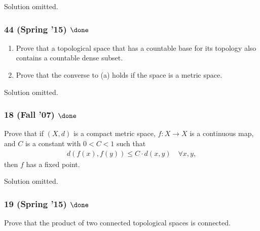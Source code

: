 Solution omitted.

\hypertarget{spring-15-done-1}{%
\subsubsection{\texorpdfstring{44 (Spring '15)
\(\done\)}{44 (Spring '15) \textbackslash done}}\label{spring-15-done-1}}

\begin{problem}[?]

\begin{enumerate}
\def\labelenumi{\alph{enumi}.}
\item
  Prove that a topological space that has a countable base for its
  topology also contains a countable dense subset.
\item
  Prove that the converse to (a) holds if the space is a metric space.
\end{enumerate}

\end{problem}

Solution omitted.

\hypertarget{fall-07-done}{%
\subsubsection{\texorpdfstring{18 (Fall '07)
\(\done\)}{18 (Fall '07) \textbackslash done}}\label{fall-07-done}}

\begin{problem}[?]

Prove that if \((X, d)\) is a compact metric space, \(f : X \to X\) is a
continuous map, and \(C\) is a constant with \(0 < C < 1\) such that
\begin{align*}
d(f (x), f (y)) \leq C \cdot d(x, y) \quad \forall x, y
,\end{align*}
then \(f\) has a fixed point.

\end{problem}

Solution omitted.

\hypertarget{spring-15-done-2}{%
\subsubsection{\texorpdfstring{19 (Spring '15)
\(\done\)}{19 (Spring '15) \textbackslash done}}\label{spring-15-done-2}}

\begin{problem}[?]

Prove that the product of two connected topological spaces is connected.

\end{problem}

